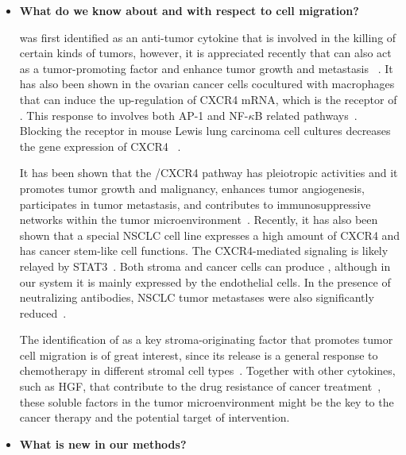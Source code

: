 \begin{itemize}
\item \textbf{What do we know about \tnfa and \sdfonea with respect to cell migration?}

\tnfa was first identified as an anti-tumor cytokine that is involved in the killing
of certain kinds of tumors, however, it is appreciated recently that \tnfa can also 
act as a tumor-promoting factor and enhance tumor growth and metastasis%
~\citep{Wu2010}. It has also been shown in the ovarian cancer cells cocultured with
macrophages that \tnfa can induce the up-regulation of 
CXCR4 mRNA, which is the receptor of \sdfonea. This response to \tnfa involves both
AP-1 and NF-$\kappa$B related pathways~\citep{Kulbe2005}. Blocking the \tnfa receptor
in mouse Lewis lung carcinoma cell cultures decreases the gene expression of CXCR4~%
\citep{Sasi2011}.

It has been shown that the \sdfonea/CXCR4 pathway has pleiotropic activities and it 
promotes tumor growth and malignancy, enhances tumor angiogenesis, participates in tumor metastasis, and contributes to immunosuppressive networks within the tumor microenvironment~\citep{Kryczek2007}. 
Recently, it has also been shown that a special NSCLC cell line expresses a
high amount of CXCR4 and has cancer stem-like cell functions. The CXCR4-mediated
signaling is likely relayed by STAT3~\citep{Jung2013}.
Both stroma and cancer cells can produce \sdfonea, 
although in our system it is mainly expressed by the endothelial cells. In the presence of neutralizing \sdfonea antibodies, NSCLC tumor metastases were also significantly reduced~\citep{Phillips2003}.

The identification of \tnfa as a key stroma-originating factor that promotes 
tumor cell migration is of great interest, since its release is a general response to chemotherapy in different stromal cell types~\citep{Acharyya2012}. Together with
other cytokines, such as HGF, that contribute to the drug resistance of cancer
treatment~\citep{Straussman2012}, these soluble factors in the tumor microenvironment
might be the key to the cancer therapy and the potential target of intervention.


\item \textbf{What is new in our methods?}


\end{itemize}
